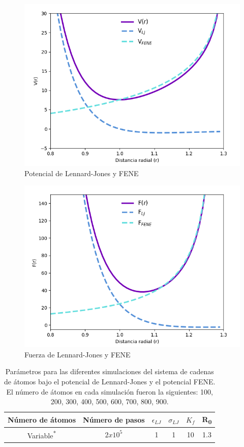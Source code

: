 \begin{figure}[H]
    \centering
    \includegraphics[scale=0.42]{../Graphics/potential.png}
    \caption{Potencial de Lennard-Jones y FENE}
    \label{fig:pot-len-jones}
\end{figure}
\begin{figure}[H]
    \centering
    \includegraphics[scale=0.42]{../Graphics/force.png}
    \caption{Fuerza de Lennard-Jones y FENE}
    \label{fig:force-len-jones}
\end{figure}
\begin{table}
    \centering
    \begin{tabular}{cccccc}
        \hline
        Número de átomos & Número de pasos &$\epsilon_{LJ}$ & $\sigma_{LJ} $ & $K_f$  & R\textsubscript{0} \\ \hline
        \multirow{2}{*}{Variable\textsuperscript{*}} & \multirow{2}{*}{$2x10^{5}$}&\multirow{2}{*}{1} &\multirow{2}{*}{1}  &\multirow{2}{*}{10}   & \multirow{2}{*}{1.3}\\
          & & & & & \\ \hline
    \end{tabular}
    \caption{Parámetros para las diferentes simulaciones del sistema de cadenas de átomos bajo el potencial de Lennard-Jones y el potencial FENE. El número de átomos en cada simulación fueron la siguientes: 100, 200, 300, 400, 500, 600, 700, 800, 900.}
    \label{table:parametros}
\end{table}
